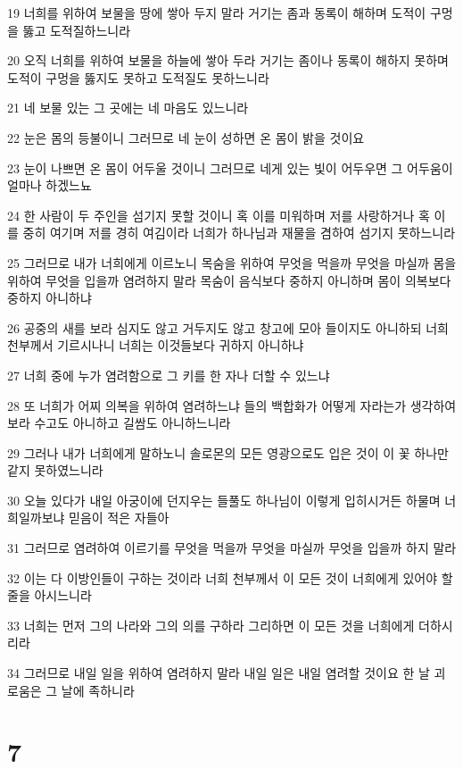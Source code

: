 \par 19 너희를 위하여 보물을 땅에 쌓아 두지 말라 거기는 좀과 동록이 해하며 도적이 구멍을 뚫고 도적질하느니라
\par 20 오직 너희를 위하여 보물을 하늘에 쌓아 두라 거기는 좀이나 동록이 해하지 못하며 도적이 구멍을 뚫지도 못하고 도적질도 못하느니라
\par 21 네 보물 있는 그 곳에는 네 마음도 있느니라
\par 22 눈은 몸의 등불이니 그러므로 네 눈이 성하면 온 몸이 밝을 것이요
\par 23 눈이 나쁘면 온 몸이 어두울 것이니 그러므로 네게 있는 빛이 어두우면 그 어두움이 얼마나 하겠느뇨
\par 24 한 사람이 두 주인을 섬기지 못할 것이니 혹 이를 미워하며 저를 사랑하거나 혹 이를 중히 여기며 저를 경히 여김이라 너희가 하나님과 재물을 겸하여 섬기지 못하느니라
\par 25 그러므로 내가 너희에게 이르노니 목숨을 위하여 무엇을 먹을까 무엇을 마실까 몸을 위하여 무엇을 입을까 염려하지 말라 목숨이 음식보다 중하지 아니하며 몸이 의복보다 중하지 아니하냐
\par 26 공중의 새를 보라 심지도 않고 거두지도 않고 창고에 모아 들이지도 아니하되 너희 천부께서 기르시나니 너희는 이것들보다 귀하지 아니하냐
\par 27 너희 중에 누가 염려함으로 그 키를 한 자나 더할 수 있느냐
\par 28 또 너희가 어찌 의복을 위하여 염려하느냐 들의 백합화가 어떻게 자라는가 생각하여 보라 수고도 아니하고 길쌈도 아니하느니라
\par 29 그러나 내가 너희에게 말하노니 솔로몬의 모든 영광으로도 입은 것이 이 꽃 하나만 같지 못하였느니라
\par 30 오늘 있다가 내일 아궁이에 던지우는 들풀도 하나님이 이렇게 입히시거든 하물며 너희일까보냐 믿음이 적은 자들아
\par 31 그러므로 염려하여 이르기를 무엇을 먹을까 무엇을 마실까 무엇을 입을까 하지 말라
\par 32 이는 다 이방인들이 구하는 것이라 너희 천부께서 이 모든 것이 너희에게 있어야 할 줄을 아시느니라
\par 33 너희는 먼저 그의 나라와 그의 의를 구하라 그리하면 이 모든 것을 너희에게 더하시리라
\par 34 그러므로 내일 일을 위하여 염려하지 말라 내일 일은 내일 염려할 것이요 한 날 괴로움은 그 날에 족하니라

\chapter{7}

